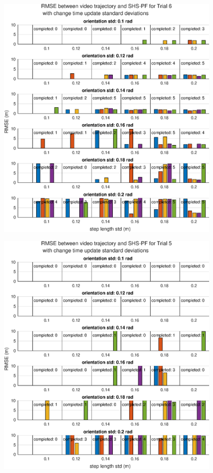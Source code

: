 \begin{figure}[H]
	\centering
	\includegraphics[width=0.6\linewidth]{images/20201201_0952_RMSE_between_video_trajectory_and_SHS-PF_for_Trial_6_1}
		\setlength{\belowcaptionskip}{-20pt}
	\caption{}
	\label{fig:202012010952rmsebetweenvideotrajectoryandshs-pffortrial61}
\end{figure}
\begin{figure}[H]
	\centering
	\includegraphics[width=0.6\linewidth]{images/20201201_0951_RMSE_between_video_trajectory_and_SHS-PF_for_Trial_5_1}
		\setlength{\belowcaptionskip}{-20pt}
	\caption{}
	\label{fig:202012010951rmsebetweenvideotrajectoryandshs-pffortrial51}
\end{figure}
